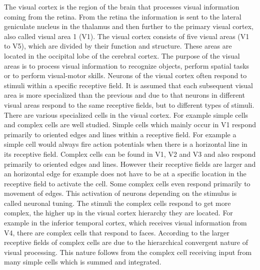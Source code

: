 The visual cortex is the region of the brain that processes visual information coming from the retina. From the retina the information is sent to the lateral geniculate nucleus in the thalamus and then further to the primary visual cortex, also called visual area 1 (V1). The visual cortex consists of five visual areas (V1 to V5), which are divided by their function and structure. These areas are located in the occipital lobe of the cerebral cortex. The purpose of the visual areas is to process visual information to recognize objects, perform spatial tasks or to perform  visual-motor skills. Neurons of the visual cortex often respond to stimuli within a specific receptive field. It is assumed that each subsequent visual area is more specialized than the previous and due to that neurons in different visual areas respond to the same receptive fields, but to different types of stimuli. There are various specialized cells in the visual cortex. For example simple cells and complex cells are well studied. Simple cells which mainly occur in V1 respond primarily to oriented edges and lines within a receptive field. For example a simple cell would always fire action potentials when there is a horizontal line in its receptive field. Complex cells can be found in V1, V2 and V3 and also respond primarily to oriented edges and lines. However their receptive fields are larger and an horizontal edge for example does not have to be at a specific location in the receptive field to activate the cell. Some complex cells even respond primarily to movement of edges. \citep{visualCortexBook}
This activation of neurons depending on the stimulus is called neuronal tuning. The stimuli the complex cells respond to get more complex, the higher up in the visual cortex hierarchy they are located. For example in the inferior temporal cortex, which receives visual information from V4, there are complex cells that respond to faces. \citep{complexCellsFaces}
According to \citet{complexCellsIntegrated} the larger receptive fields of complex cells are due to the hierarchical convergent nature of visual processing. This nature follows from the complex cell receiving input from many simple cells which is summed and integrated.

